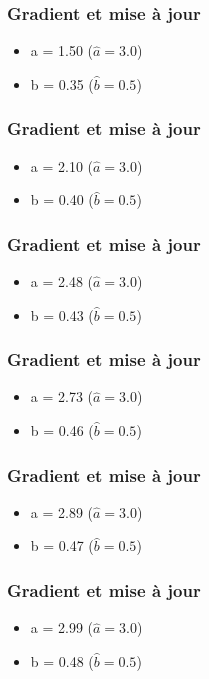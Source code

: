 \begin{frame}
  \frametitle{Gradient et mise à jour}
  \begin{itemize}
  \item a = 1.50 ($\hat{a} = 3.0$)
  \item b = 0.35 ($\hat{b} = 0.5$)
  \end{itemize}
\end{frame}

\begin{frame}
  \frametitle{Gradient et mise à jour}
  \begin{itemize}
  \item a = 2.10 ($\hat{a} = 3.0$)
  \item b = 0.40 ($\hat{b} = 0.5$)
  \end{itemize}
\end{frame}

\begin{frame}
  \frametitle{Gradient et mise à jour}
  \begin{itemize}
  \item a = 2.48 ($\hat{a} = 3.0$)
  \item b = 0.43 ($\hat{b} = 0.5$)
  \end{itemize}
\end{frame}

\begin{frame}
  \frametitle{Gradient et mise à jour}
  \begin{itemize}
  \item a = 2.73 ($\hat{a} = 3.0$)
  \item b = 0.46 ($\hat{b} = 0.5$)
  \end{itemize}
\end{frame}

\begin{frame}
  \frametitle{Gradient et mise à jour}
  \begin{itemize}
  \item a = 2.89 ($\hat{a} = 3.0$)
  \item b = 0.47 ($\hat{b} = 0.5$)
  \end{itemize}
\end{frame}

\begin{frame}
  \frametitle{Gradient et mise à jour}
  \begin{itemize}
  \item a = 2.99 ($\hat{a} = 3.0$)
  \item b = 0.48 ($\hat{b} = 0.5$)
  \end{itemize}
\end{frame}

